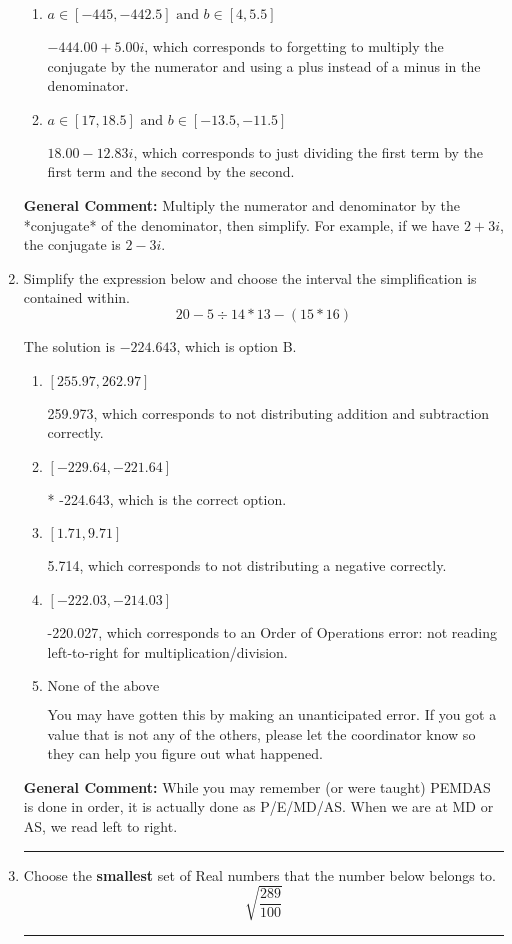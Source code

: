 \documentclass{extbook}[14pt]
\newcommand{\litem}[1]{\item #1

\rule{\textwidth}{0.4pt}}
\begin{document}
\begin{enumerate}
{\begin{enumerate}[label=\Alph*.]
* $-12.00  + 5.00 i$, which is the correct option.
\item \( a \in [-445, -442.5] \text{ and } b \in [4, 5.5] \)

 $-444.00  + 5.00 i$, which corresponds to forgetting to multiply the conjugate by the numerator and using a plus instead of a minus in the denominator.
\item \( a \in [17, 18.5] \text{ and } b \in [-13.5, -11.5] \)

 $18.00  - 12.83 i$, which corresponds to just dividing the first term by the first term and the second by the second.
\end{enumerate}

\textbf{General Comment:} Multiply the numerator and denominator by the *conjugate* of the denominator, then simplify. For example, if we have $2+3i$, the conjugate is $2-3i$.
}
\litem{
Simplify the expression below and choose the interval the simplification is contained within.
\[ 20 - 5 \div 14 * 13 - (15 * 16) \]

The solution is \( -224.643 \), which is option B.\begin{enumerate}[label=\Alph*.]
\item \( [255.97, 262.97] \)

 259.973, which corresponds to not distributing addition and subtraction correctly.
\item \( [-229.64, -221.64] \)

* -224.643, which is the correct option.
\item \( [1.71, 9.71] \)

 5.714, which corresponds to not distributing a negative correctly.
\item \( [-222.03, -214.03] \)

 -220.027, which corresponds to an Order of Operations error: not reading left-to-right for multiplication/division.
\item \( \text{None of the above} \)

 You may have gotten this by making an unanticipated error. If you got a value that is not any of the others, please let the coordinator know so they can help you figure out what happened.
\end{enumerate}

\textbf{General Comment:} While you may remember (or were taught) PEMDAS is done in order, it is actually done as P/E/MD/AS. When we are at MD or AS, we read left to right.
}
\litem{
Choose the \textbf{smallest} set of Real numbers that the number below belongs to.
\[ \sqrt{\frac{289}{100}} \]

}
\end{enumerate}
\end{document}
